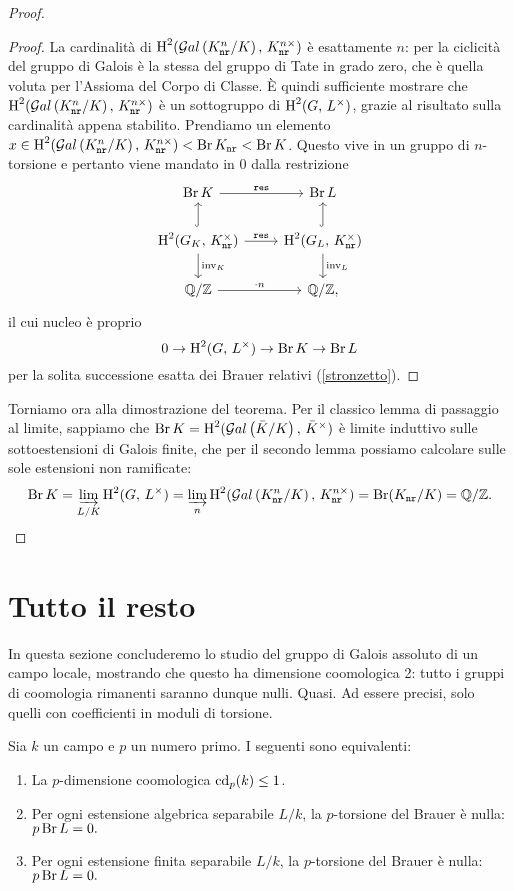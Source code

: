 \begin{proof}
\begin{proof}
	La cardinalità di $ \operatorname{H}^2(\mathcal{G}al\left( K_\mathtt{nr}^n/K \right),\, K_\mathtt{nr}^{n\times}) $ è esattamente $ n $: per la ciclicità del gruppo di Galois è la stessa del gruppo di Tate in grado zero, che è quella voluta per l'Assioma del Corpo di Classe. È quindi sufficiente mostrare che $ \operatorname{H}^2(\mathcal{G}al\left( K_\mathtt{nr}^n/K \right),\, K_\mathtt{nr}^{n\times}) $ è un sottogruppo di $ \operatorname{H}^2(G,\, L^\times ) $, grazie al risultato sulla cardinalità appena stabilito.
	Prendiamo un elemento $ x \in \operatorname{H}^2(\mathcal{G}al\left( K_\mathtt{nr}^n/K \right),\, K_\mathtt{nr}^{n\times}) < \operatorname{Br} K_\mathtt{nr} < \operatorname{Br} K $. Questo vive in un gruppo di $ n $-torsione e pertanto viene mandato in $ 0 $ dalla restrizione
	\[ \begin{tikzcd}
	\Br \K \rar["\Res"]
	& \Br L \\
	\HH^2(G_\K, \, \knr^\times) \rar["\Res"] \dar["\inv_\K"] \arrow[hook]{u}
	& \HH^2(G_L, \, \knr^\times) \dar["\inv_L"] \arrow[hook]{u} \\
	\Q/\Z \rar["\cdot n"]
	& \Q/\Z,
	\end{tikzcd} \]
	il cui nucleo è proprio
	\[ 0 \to \operatorname{H}^2(G, \, L^\times) \to \operatorname{Br} K \to \operatorname{Br} L \]
	per la solita successione esatta dei Brauer relativi (\ref{stronzetto}).
\end{proof}

Torniamo ora alla dimostrazione del teorema. Per il classico lemma di passaggio al limite, sappiamo che $ \operatorname{Br} K = \operatorname{H}^2(\mathcal{G}al\left( \bar{K}/K \right), \, \bar{K}^\times) $ è limite induttivo sulle sottoestensioni di Galois finite, che per il secondo lemma possiamo calcolare sulle sole estensioni non ramificate:
\[ \operatorname{Br} K = \varinjlim_{L/K} \operatorname{H}^2(G, \, L^\times) = \varinjlim_{n} \operatorname{H}^2(\mathcal{G}al\left( K_\mathtt{nr}^n/K \right),\, K_\mathtt{nr}^{n\times}) = \operatorname{Br} (K_\mathtt{nr} /K) = \mathbb{Q}/\mathbb{Z}. \]

\end{proof}

\section{Tutto il resto}
In questa sezione concluderemo lo studio del gruppo di Galois assoluto di un campo locale, mostrando che questo ha dimensione coomologica 2: tutto i gruppi di coomologia rimanenti saranno dunque nulli. Quasi. Ad essere precisi, solo quelli con coefficienti in moduli di torsione.

\begin{lemma}
	Sia $ k $ un campo e $ p $ un numero primo. I seguenti sono equivalenti:
	\begin{enumerate}
		\item La $ p $-dimensione coomologica $ \operatorname{cd}_p(k) \leq 1 $.
		\item Per ogni estensione algebrica separabile $ L/k $, la $ p $-torsione del Brauer è nulla: $ p \operatorname{Br} L = 0. $
		\item Per ogni estensione finita separabile $ L/k $, la $ p $-torsione del Brauer è nulla: $ p \operatorname{Br} L = 0. $
	\end{enumerate}
\end{lemma}

